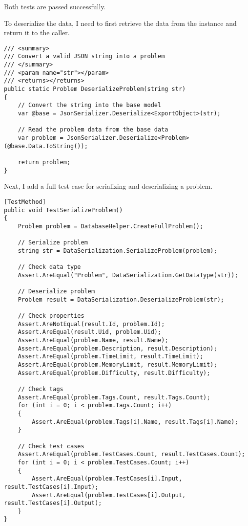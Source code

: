 \documentclass[report.tex]{subfiles}
\begin{document}
Both tests are passed successfully.

To deserialize the data, I need to first retrieve the data from the  instance and return it to the caller.

\begin{verbatim}
/// <summary>
/// Convert a valid JSON string into a problem
/// </summary>
/// <param name="str"></param>
/// <returns></returns>
public static Problem DeserializeProblem(string str)
{
    // Convert the string into the base model
    var @base = JsonSerializer.Deserialize<ExportObject>(str);

    // Read the problem data from the base data
    var problem = JsonSerializer.Deserialize<Problem>(@base.Data.ToString());

    return problem;
}
\end{verbatim}

Next, I add a full test case for serializing and deserializing a problem.

\begin{verbatim}
[TestMethod]
public void TestSerializeProblem()
{
    Problem problem = DatabaseHelper.CreateFullProblem();
    
    // Serialize problem
    string str = DataSerialization.SerializeProblem(problem);

    // Check data type
    Assert.AreEqual("Problem", DataSerialization.GetDataType(str));

    // Deserialize problem
    Problem result = DataSerialization.DeserializeProblem(str);
    
    // Check properties
    Assert.AreNotEqual(result.Id, problem.Id);
    Assert.AreEqual(result.Uid, problem.Uid);
    Assert.AreEqual(problem.Name, result.Name);
    Assert.AreEqual(problem.Description, result.Description);
    Assert.AreEqual(problem.TimeLimit, result.TimeLimit);
    Assert.AreEqual(problem.MemoryLimit, result.MemoryLimit);
    Assert.AreEqual(problem.Difficulty, result.Difficulty);
    
    // Check tags
    Assert.AreEqual(problem.Tags.Count, result.Tags.Count);
    for (int i = 0; i < problem.Tags.Count; i++)
    {
        Assert.AreEqual(problem.Tags[i].Name, result.Tags[i].Name);
    }
    
    // Check test cases
    Assert.AreEqual(problem.TestCases.Count, result.TestCases.Count);
    for (int i = 0; i < problem.TestCases.Count; i++)
    {
        Assert.AreEqual(problem.TestCases[i].Input, result.TestCases[i].Input);
        Assert.AreEqual(problem.TestCases[i].Output, result.TestCases[i].Output);
    }
}
\end{verbatim}
\end{document}

